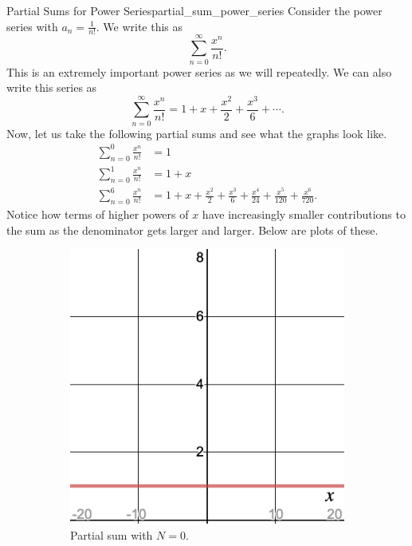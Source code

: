 \begin{ex}{Partial Sums for Power Series}{partial_sum_power_series}
Consider the power series with $a_n = \frac{1}{n!}$. We write this as
\[
\sum_{n=0}^\infty \frac{x^n}{n!}.
\]
This is an extremely important power series as we will repeatedly.  We can also write this series as
\[
\sum_{n=0}^\infty \frac{x^n}{n!} = 1 + x + \frac{x^2}{2}+\frac{x^3}{6}+\cdots.
\]
Now, let us take the following partial sums and see what the graphs look like. 
\begin{align*}
    \sum_{n=0}^0 \frac{x^n}{n!} &= 1\\
    \sum_{n=0}^1 \frac{x^n}{n!} &= 1+x\\
    \sum_{n=0}^6 \frac{x^n}{n!} &= 1+x+\frac{x^2}{2}+\frac{x^3}{6}+\frac{x^4}{24}+\frac{x^5}{120}+\frac{x^6}{720}.
\end{align*}
Notice how terms of higher powers of $x$ have increasingly smaller contributions to the sum as the denominator gets larger and larger. Below are plots of these.
\begin{figure}[H]
\centering
    \begin{subfigure}[h]{.3\textwidth}
        \includegraphics[width=\textwidth]{Figures_Part_3/ex_powseries_N=0.png}
        \caption{Partial sum with $N=0$.}
    \end{subfigure}
    ~
    \begin{subfigure}[h]{.3\textwidth}

\end{subfigure}
\end{figure}
\end{ex}
